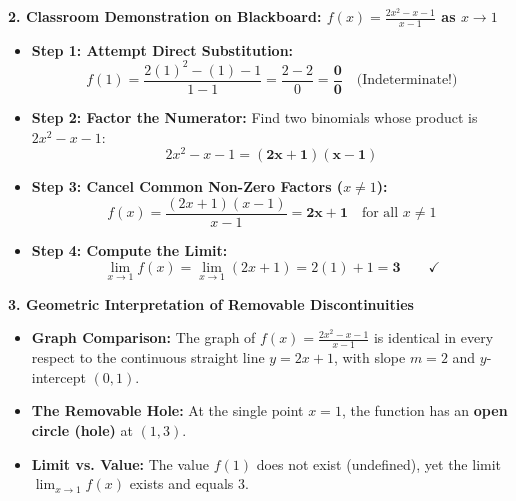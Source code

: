 \documentclass[10.5pt]{article}
\begin{document}
\vspace{0.04in}

\textbf{\large 2. Classroom Demonstration on Blackboard: $f(x) = \frac{2x^2 - x - 1}{x - 1}$ as $x \to 1$}

\begin{itemize}[leftmargin=1.2em, topsep=1pt, itemsep=3pt]
  \item \textbf{Step 1: Attempt Direct Substitution:}
  \[
    f(1) = \frac{2(1)^2 - (1) - 1}{1 - 1} = \frac{2 - 2}{0} = \mathbf{\frac{0}{0}} \quad \text{(Indeterminate!)}
  \]
  \item \textbf{Step 2: Factor the Numerator:}
  Find two binomials whose product is $2x^2 - x - 1$:
  \[
    2x^2 - x - 1 = \mathbf{(2x + 1)(x - 1)}
  \]
  \item \textbf{Step 3: Cancel Common Non-Zero Factors ($x \ne 1$):}
  \[
    f(x) = \frac{(2x + 1)(x - 1)}{x - 1} = \mathbf{2x + 1} \quad \text{for all } x \ne 1
  \]
  \item \textbf{Step 4: Compute the Limit:}
  \[
    \lim_{x\to 1} f(x) = \lim_{x\to 1} (2x + 1) = 2(1) + 1 = \mathbf{3} \qquad \checkmark
  \]
\end{itemize}

\vspace{0.04in}

\textbf{\large 3. Geometric Interpretation of Removable Discontinuities}

\begin{tcolorbox}[colback=chalkblue!6, colframe=chalkblue, boxrule=1pt, arc=3pt, left=8pt, right=8pt, top=4pt, bottom=4pt]
\begin{itemize}[leftmargin=1.2em, topsep=1pt, itemsep=2pt]
  \item \textbf{Graph Comparison:} The graph of $f(x) = \frac{2x^2 - x - 1}{x - 1}$ is identical in every respect to the continuous straight line $y = 2x + 1$, with slope $m = 2$ and $y$-intercept $(0,1)$.
  \item \textbf{The Removable Hole:} At the single point $x = 1$, the function has an \textbf{open circle (hole)} at $(1, 3)$.
  \item \textbf{Limit vs. Value:} The value $f(1)$ does not exist (undefined), yet the limit $\lim_{x\to 1} f(x)$ exists and equals $3$.
\end{itemize}
\end{tcolorbox}
\end{document}
